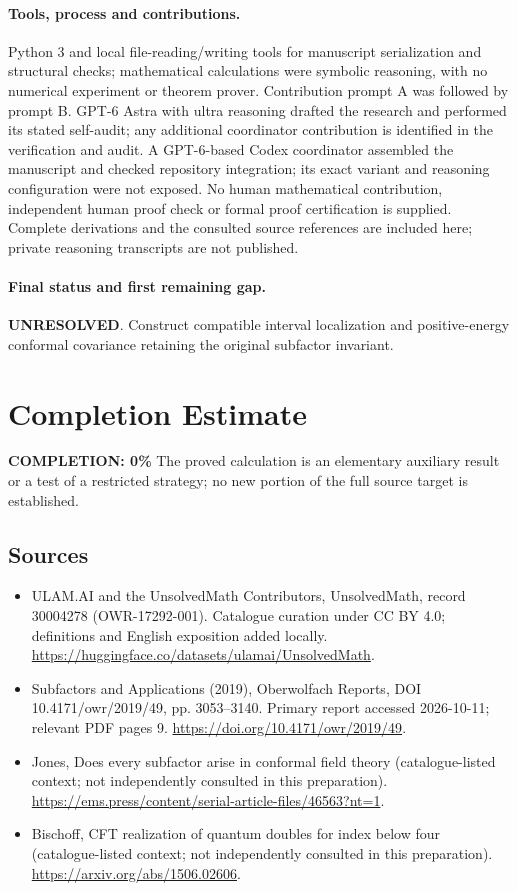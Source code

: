 \documentclass[11pt]{article}
\begin{document}
\paragraph{Tools, process and contributions.}
Python 3 and local file-reading/writing tools for manuscript serialization and structural checks; mathematical calculations were symbolic reasoning, with no numerical experiment or theorem prover. Contribution prompt A was followed by prompt B. GPT-6 Astra with ultra reasoning drafted the research and performed its stated self-audit; any additional coordinator contribution is identified in the verification and audit. A GPT-6-based Codex coordinator assembled the manuscript and checked repository integration; its exact variant and reasoning configuration were not exposed. No human mathematical contribution, independent human proof check or formal proof certification is supplied. Complete derivations and the consulted source references are included here; private reasoning transcripts are not published.

\paragraph{Final status and first remaining gap.}
\textbf{UNRESOLVED}. Construct compatible interval localization and positive-energy conformal covariance retaining the original subfactor invariant.

\section{Completion Estimate}
\noindent\textbf{COMPLETION: 0\%}
The proved calculation is an elementary auxiliary result or a test of a restricted strategy; no new portion of the full source target is established.

\subsection{Sources}
\begin{itemize}
\item[\hypertarget{source:30004278:1}{S1}] ULAM.AI and the UnsolvedMath Contributors, UnsolvedMath, record 30004278 (OWR-17292-001). Catalogue curation under CC BY 4.0; definitions and English exposition added locally.
\url{https://huggingface.co/datasets/ulamai/UnsolvedMath}.
\item[\hypertarget{source:30004278:2}{S2}] Subfactors and Applications (2019), Oberwolfach Reports, DOI 10.4171/owr/2019/49, pp. 3053--3140. Primary report accessed 2026-10-11; relevant PDF pages 9.
\url{https://doi.org/10.4171/owr/2019/49}.
\item[\hypertarget{source:30004278:3}{S3}] Jones, Does every subfactor arise in conformal field theory (catalogue-listed context; not independently consulted in this preparation).
\url{https://ems.press/content/serial-article-files/46563?nt=1}.
\item[\hypertarget{source:30004278:4}{S4}] Bischoff, CFT realization of quantum doubles for index below four (catalogue-listed context; not independently consulted in this preparation).
\url{https://arxiv.org/abs/1506.02606}.
\end{itemize}
\label{end:30004278}
\end{document}
